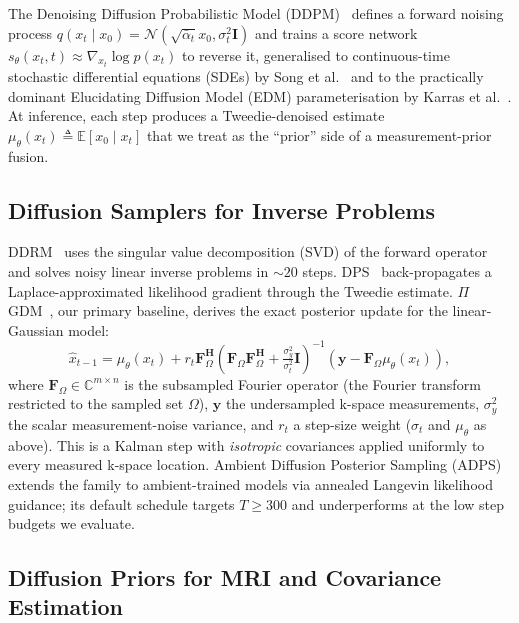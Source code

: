 \documentclass[10pt,twocolumn,letterpaper]{article}
\newcommand{\muth}{\mu_\theta}
\begin{document}
The Denoising Diffusion Probabilistic Model (DDPM)~\cite{ho2020ddpm} defines
a forward noising process
$q(x_t \mid x_0)\!=\!\mathcal{N}(\sqrt{\bar{\alpha}_t} x_0, \sigma_t^2
\mathbf{I})$ and trains a score network $s_\theta(x_t, t)\!\approx\!
\nabla_{x_t} \log p(x_t)$ to reverse it, generalised to continuous-time
stochastic differential equations (SDEs) by Song et al.~\cite{song2021score}
and to the practically dominant Elucidating Diffusion Model (EDM)
parameterisation by Karras et al.~\cite{karras2022edm}. At inference, each
step produces a Tweedie-denoised estimate
$\muth(x_t) \!\triangleq\!\mathbb{E}[x_0\mid x_t]$ that we treat as the ``prior''
side of a measurement-prior fusion.

\subsection{Diffusion Samplers for Inverse Problems}

DDRM~\cite{kawar2022ddrm} uses the singular value decomposition (SVD) of
the forward operator and solves noisy linear inverse problems in ${\sim}20$
steps. DPS~\cite{chung2023dps} back-propagates a Laplace-approximated
likelihood gradient through the Tweedie estimate. $\Pi$GDM~\cite{song2023pigdm},
our primary baseline, derives the exact posterior update for the
linear-Gaussian model:
\begin{equation}
  \hat{x}_{t-1} = \muth(x_t) + r_t \mathbf{F}_\Omega^\mathbf{H}
  \!\left(\mathbf{F}_\Omega\mathbf{F}_\Omega^\mathbf{H} + \tfrac{\sigma_y^2}{\sigma_t^2}
  \mathbf{I}\right)^{-1}\!\!(\mathbf{y} - \mathbf{F}_\Omega\muth(x_t)),
  \label{eq:pigdm}
\end{equation}
where $\mathbf{F}_\Omega\in\mathbb{C}^{m\times n}$ is the subsampled Fourier
operator (the Fourier transform restricted to the sampled set $\Omega$),
$\mathbf{y}$ the undersampled k-space measurements, $\sigma_y^2$ the scalar
measurement-noise variance, and $r_t$ a step-size weight ($\sigma_t$ and
$\muth$ as above). This is a Kalman step with \emph{isotropic} covariances
applied uniformly to every measured k-space location. Ambient Diffusion
Posterior Sampling
(ADPS)~\cite{daras2025ambient} extends the family to ambient-trained models
via annealed Langevin likelihood guidance; its default schedule targets
$T\!\geq\!300$ and underperforms at the low step budgets we evaluate.

\subsection{Diffusion Priors for MRI and Covariance Estimation}
\end{document}
